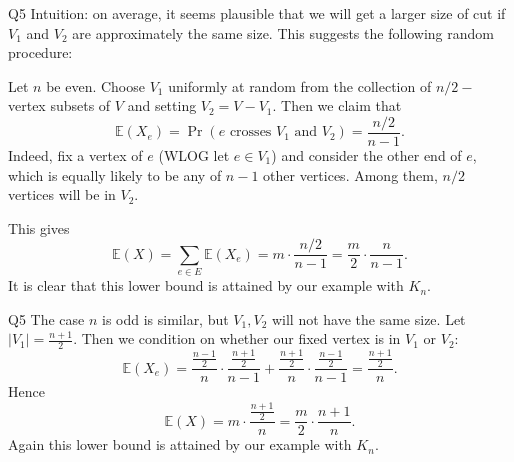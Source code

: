 \documentclass[t]{beamer}
\begin{document}
\begin{frame}{Q5}
  Intuition: on average, it seems plausible that we will get a larger size of cut if $V_1$ and $V_2$ are approximately the same size. This suggests the following random procedure:
  \par Let $n$ be even. Choose $V_1$ uniformly at random from the collection of $n/2-$vertex subsets of $V$ and setting $V_2 = V-V_1$. Then we claim that 
  \[\mathbb{E}(X_e) = \Pr(\text{$e$ crosses $V_1$ and $V_2$}) = \frac{n/2}{n-1}. \]
  Indeed, fix a vertex of $e$ (WLOG let $e \in V_1$) and consider the other end of $e$, which is equally likely to be any of $n-1$ other vertices. Among them, $n/2$ vertices will be in $V_2$. 
  \par This gives
  \[\mathbb{E}(X) = \sum_{e \in E} \mathbb{E}(X_e) = m \cdot \frac{n/2}{n-1} = \frac{m}{2} \cdot \frac{n}{n-1}. \]
  It is clear that this lower bound is attained by our example with $K_n$. 
\end{frame}
\begin{frame}{Q5}
  The case $n$ is odd is similar, but $V_1, V_2$ will not have the same size. Let $|V_1| = \frac{n+1}{2}$. Then we condition on whether our fixed vertex is in $V_1$ or $V_2$:
  \[\mathbb{E}(X_e)= \frac{\frac{n-1}{2}}{n}\cdot \frac{\frac{n+1}{2}}{n-1} + \frac{\frac{n+1}{2}}{n}\cdot \frac{\frac{n-1}{2}}{n-1} = \frac{\frac{n+1}{2}}{n}.\]
  Hence
  \[\mathbb{E}(X) = m \cdot \frac{\frac{n+1}{2}}{n}= \frac{m}{2} \cdot \frac{n+1}{n}. \]
  Again this lower bound is attained by our example with $K_n$. 
\end{frame}
\end{document}
